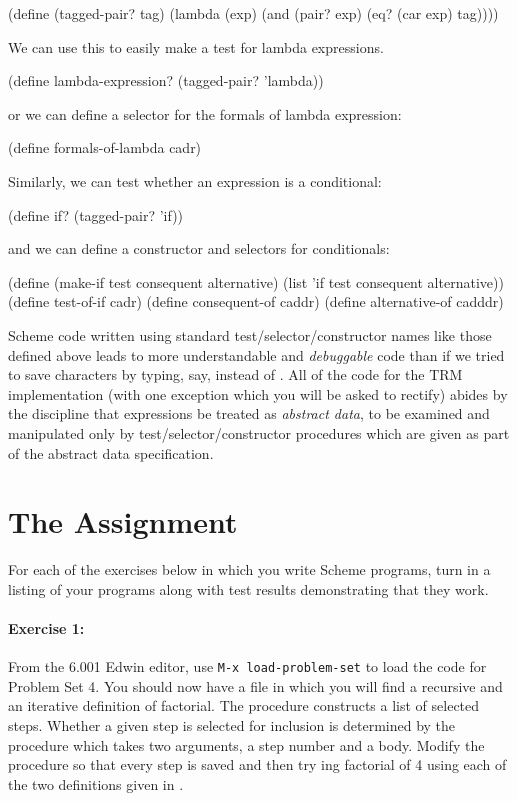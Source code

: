 \beginlispbig
(define (tagged-pair? tag)
  (lambda (exp)
    (and (pair? exp)
         (eq? (car exp) tag))))
\endlisp

\noindent
We can use this to easily make a test for lambda expressions.

\beginlispbig
(define lambda-expression? (tagged-pair? 'lambda))
\endlisp

\noindent
or we can define a selector for the formals of lambda expression:

\beginlispbig
(define formals-of-lambda cadr)
\endlisp

\noindent
Similarly, we can test whether an expression is a conditional:

\beginlispbig
(define if? (tagged-pair? 'if))
\endlisp

\noindent
and we can define a constructor and selectors for conditionals:

\beginlispbig
(define (make-if test consequent alternative)
  (list 'if test consequent alternative))
\null
(define test-of-if cadr)
(define consequent-of caddr)
(define alternative-of cadddr)
\endlisp

Scheme code written using standard test/selector/constructor names
like those defined above leads to more understandable and {\em
debuggable} code than if we tried to save characters by typing, say,
 instead of .  All of the code for
the TRM implementation (with one exception which you will be asked to
rectify) abides by the discipline that expressions be treated as {\em
abstract data}, to be examined and manipulated only by
test/selector/constructor procedures which are given as part of the
abstract data specification.

\section{The Assignment}

For each of the exercises below in which you write Scheme programs, turn
in a listing of your programs along with test results demonstrating that
they work.

\paragraph{Exercise 1:} From the 6.001 Edwin editor, use {\tt M-x
load-problem-set} to load the code for Problem Set 4.  You should now
have a file  in which you will find a recursive and an
iterative definition of factorial.  The procedure 
constructs a list of selected steps.  Whether a given step is selected
for inclusion is determined by the procedure 
which takes two arguments, a step number and a body.  Modify the
procedure
 so that every step is saved and then try
ing factorial of 4 using each of the two definitions
given in .

